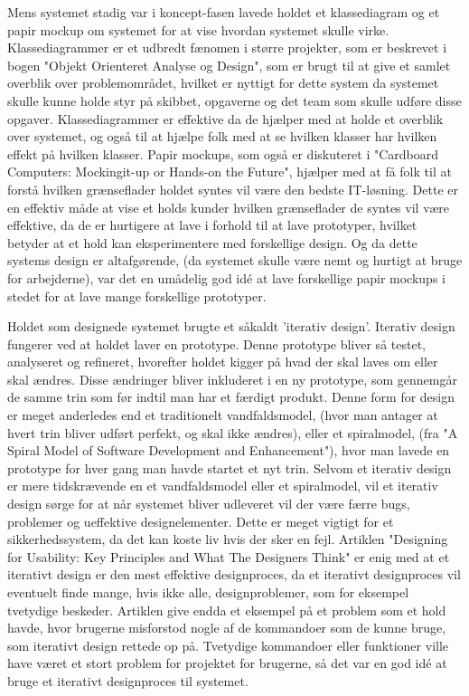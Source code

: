 \documentclass[10pt,a4paper,danish]{article}
\begin{document}
Mens systemet stadig var i koncept-fasen lavede holdet et klassediagram og et papir mockup om systemet for at vise 
hvordan systemet skulle virke. Klassediagrammer er et udbredt fænomen i større projekter, som er beskrevet i bogen 
"Objekt Orienteret Analyse og Design", som er brugt til at give et samlet overblik over problemområdet, hvilket 
er nyttigt for dette system da systemet skulle kunne holde styr på skibbet, opgaverne og det team som skulle 
udføre disse opgaver. Klassediagrammer er effektive da de hjælper med at holde et overblik over systemet, og 
også til at hjælpe folk med at se hvilken klasser har hvilken effekt på hvilken klasser. Papir mockups, som også 
er diskuteret i "Cardboard Computers: Mockingit-up or Hands-on the Future", hjælper med at få folk til at forstå 
hvilken grænseflader holdet syntes vil være den bedste IT-løsning. Dette er en effektiv måde at vise et holds kunder 
hvilken grænseflader de syntes vil være effektive, da de er hurtigere at lave i forhold til at lave prototyper, hvilket 
betyder at et hold kan eksperimentere med forskellige design. Og da dette systems design er altafgørende, (da systemet 
skulle være nemt og hurtigt at bruge for arbejderne), var det en umådelig god idé at lave forskellige papir mockups i stedet 
for at lave mange forskellige prototyper.

Holdet som designede systemet brugte et såkaldt 'iterativ design'. Iterativ design fungerer ved at holdet 
laver en prototype. Denne prototype bliver så testet, analyseret og refineret, hvorefter holdet kigger 
på hvad der skal laves om eller skal ændres. Disse ændringer bliver inkluderet i en ny prototype, som gennemgår 
de samme trin som før indtil man har et færdigt produkt. Denne form for design er meget anderledes end et 
traditionelt vandfaldsmodel, (hvor man antager at hvert trin bliver udført perfekt, og skal ikke ændres), eller et 
spiralmodel, (fra "A Spiral Model of Software Development and Enhancement"), hvor man lavede en prototype  
for hver gang man havde startet et nyt trin. Selvom et iterativ design er mere tidskrævende en et 
vandfaldsmodel eller et spiralmodel, vil et iterativ design sørge for at når systemet bliver udleveret 
vil der være færre bugs, problemer og ueffektive designelementer. Dette er meget vigtigt for et sikkerhedssystem, 
da det kan koste liv hvis der sker en fejl. Artiklen "Designing for Usability: Key Principles and What The Designers 
Think" er enig med at et iterativt design er den mest effektive designproces, da et iterativt designproces vil eventuelt 
finde mange, hvis ikke alle, designproblemer, som for eksempel tvetydige beskeder. Artiklen give endda et eksempel 
på et problem som et hold havde, hvor brugerne misforstod nogle af de kommandoer som de kunne bruge, som iterativt design 
rettede op på. Tvetydige kommandoer eller funktioner ville have været et stort problem for projektet for brugerne, så 
det var en god idé at bruge et iterativt designproces til systemet.
\end{document}
